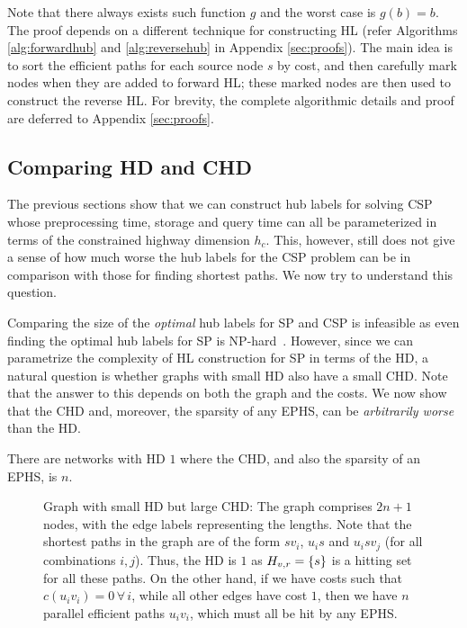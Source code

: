 Note that there always exists such function $g$ and the worst case is $g(b)=b$.
The proof depends on a different technique for constructing HL (refer Algorithms \ref{alg:forwardhub} and \ref{alg:reversehub} in Appendix \ref{sec:proofs}). The main idea is to sort the efficient paths for each source node $s$ by cost, and then carefully mark nodes when they are added to forward HL; these marked nodes are then used to construct the reverse HL.
For brevity, the complete algorithmic details and proof are deferred to Appendix \ref{sec:proofs}.


\subsection{Comparing HD and CHD}
\label{ssec:hdvschd}

The previous sections show that we can construct hub labels for solving CSP whose preprocessing time, storage and query time can all be parameterized in terms of the constrained highway dimension $h_c$. 
This, however, still does not give a sense of how much worse the hub labels for the CSP problem can be in comparison with those for finding shortest paths. 
We now try to understand this question.

Comparing the size of the \emph{optimal} hub labels for SP and CSP is infeasible as even finding the optimal hub labels for SP is NP-hard~\cite{babenko_hl_complexity}. However, since we can parametrize the complexity of HL construction for SP in terms of the HD, a natural question is whether graphs with small HD also have a small CHD. Note that the answer to this depends on both the graph and the costs.
We now show that the CHD and, moreover, the sparsity of any EPHS, can be \emph{arbitrarily worse} than the HD. 
\begin{proposition}
	There are networks with HD $1$ where the CHD, and also the sparsity of an EPHS, is $n$.
\end{proposition}

\begin{figure}
	
	\caption{Graph with small HD but large CHD: The graph comprises $2n+1$ nodes, with the edge labels representing the lengths. Note that the shortest paths in the graph are of the form $sv_i$, $u_is$ and $u_isv_j$ (for all combinations $i,j$). Thus, the HD is $1$ as $H_{v,r}=\{s\}$ is a hitting set for all these paths. On the other hand, if we have costs such that $c(u_iv_i)=0\,\forall\,i$, while all other edges have cost $1$, then we have $n$ parallel efficient paths $u_iv_i$, which must all be hit by any EPHS.}
	\label{fig:big_chd}
\end{figure}

